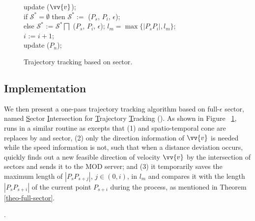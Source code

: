 \begin{figure}[tb!]
\begin{center}
{\begin{minipage}{3.3in}
{					\icc \>\hspace{7ex}    update ($\vv{v}$); \\
					\icc \>\hspace{3ex} if $\mathcal{S}^*=\emptyset$ then $\mathcal{S}^*:=$ ($P_s$, $P_{i}$, $\epsilon$); \\
					\icc \>\hspace{3ex} else $\mathcal{S}^*$ := $\mathcal{S}^*\bigsqcap$ ($P_s$, $P_{i}$, $\epsilon$); $l_{m} = \max\{|P_sP_{i}|, l_{m}\}$;\\
					\icc \>\hspace{3ex} $i$ := $i +1$;\\
					\icc \>\hspace{0ex} update ($P_{n}$); 
				}
				\vspace{-2ex}
				\myhrule
			\end{minipage}
		}
	\end{center}
	\vspace{-1ex}
	\caption{\small Trajectory tracking based on sector.}
	\label{alg:sitt}
	\vspace{-1ex}
\end{figure}

\subsection{Implementation}

We then present a one-pass trajectory tracking algorithm based on full-$\epsilon$ sector, named \underline{S}ector \underline{I}ntersection for \underline{T}rajectory \underline{T}racking (\sitt). As shown in Figure ~\ref{alg:sitt}, \sitt runs in a similar routine as \citt excepts that (1) \sed and spatio-temporal cone are replaces by \ped and sector, (2) only the direction information of $\vv{v}$ is needed while the speed information is not, such that when a distance deviation occurs, \sitt quickly finds out a new feasible direction of velocity $\vv{v}$ by the intersection of sectors and sends it to the MOD server; and (3) it temporarily saves the maximum length of $|P_sP_{s+j}|$, $j\in (0, i)$, in $l_m$ and compares it with the length $|P_sP_{s+i}|$ of the current point $P_{s+i}$ during the process, as mentioned in Theorem \ref{theo-full-sector}. 


\begin{example}
	\todo.
\end{example}


